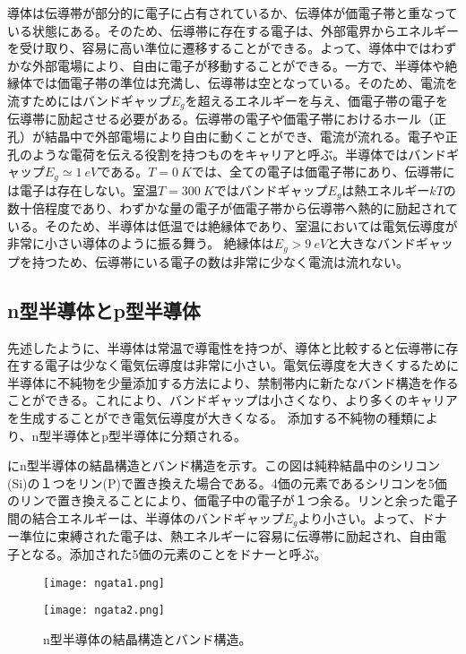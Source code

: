 導体は伝導帯が部分的に電子に占有されているか、伝導体が価電子帯と重なっている状態にある。そのため、伝導帯に存在する電子は、外部電界からエネルギーを受け取り、容易に高い準位に遷移することができる。よって、導体中ではわずかな外部電場により、自由に電子が移動することができる。一方で、半導体や絶縁体では価電子帯の準位は充満し、伝導帯は空となっている。そのため、電流を流すためにはバンドギャップ$E_g$を超えるエネルギーを与え、価電子帯の電子を伝導帯に励起させる必要がある。伝導帯の電子や価電子帯におけるホール（正孔）が結晶中で外部電場により自由に動くことができ、電流が流れる。電子や正孔のような電荷を伝える役割を持つものをキャリアと呼ぶ。半導体ではバンドギャップ$E_g\simeq 1\ \si{eV}$である。$T=0\ \si{K}$では、全ての電子は価電子帯にあり、伝導帯には電子は存在しない。室温$T=300\ \si{K}$ではバンドギャップ$E_g$は熱エネルギー$kT$の数十倍程度であり、わずかな量の電子が価電子帯から伝導帯へ熱的に励起されている。そのため、半導体は低温では絶縁体であり、室温においては電気伝導度が非常に小さい導体のように振る舞う。
絶縁体は$E_g>9\ \si{eV}$と大きなバンドギャップを持つため、伝導帯にいる電子の数は非常に少なく電流は流れない。

\subsection{n型半導体とp型半導体}
\label{sec:pngata}
先述したように、半導体は常温で導電性を持つが、導体と比較すると伝導帯に存在する電子は少なく電気伝導度は非常に小さい。電気伝導度を大きくするために半導体に不純物を少量添加する方法により、禁制帯内に新たなバンド構造を作ることができる。これにより、バンドギャップは小さくなり、より多くのキャリアを生成することができ電気伝導度が大きくなる。
添加する不純物の種類により、n型半導体とp型半導体に分類される。

にn型半導体の結晶構造とバンド構造を示す。この図は純粋結晶中のシリコン(Si)の１つをリン(P)で置き換えた場合である。4価の元素であるシリコンを5価のリンで置き換えることにより、価電子中の電子が１つ余る。リンと余った電子間の結合エネルギーは、半導体のバンドギャップ$E_g$より小さい。よって、ドナー準位に束縛された電子は、熱エネルギーに容易に伝導帯に励起され、自由電子となる。添加された5価の元素のことをドナーと呼ぶ。
\begin{figure}[tbp]
  \begin{minipage}[b]{0.5\linewidth}
    \centering
    \texttt{[image: ngata1.png]}
  \end{minipage}
  \begin{minipage}[b]{0.5\linewidth}
    \centering
    \texttt{[image: ngata2.png]}
  \end{minipage}
  \caption[n型半導体の結晶構造とバンド構造]{n型半導体の結晶構造とバンド構造。}
  \label{fig:ngata}
\end{figure}

